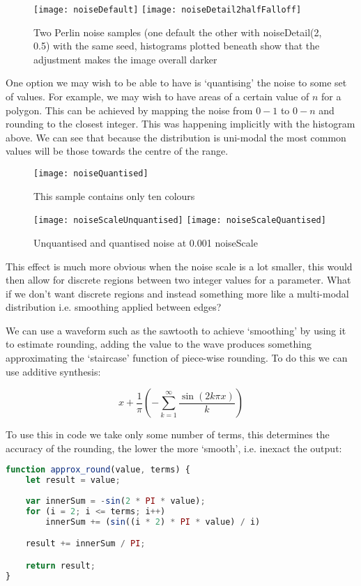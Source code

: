 \begin{figure}[H]
\centering
\texttt{[image: noiseDefault]}
\hspace{0.2cm}
\texttt{[image: noiseDetail2halfFalloff]}
\caption{Two Perlin noise samples (one default the other with
noiseDetail(2, 0.5) with the same seed, histograms plotted beneath show
that the adjustment makes the image overall darker}
\end{figure}

One option we may wish to be able to have is `quantising' the noise to some set
of values. For example, we may wish to have areas of a certain value of $n$ for a
polygon. This can be achieved by mapping the noise from $0-1$ to $0-n$ and
rounding to the closest integer. This was happening implicitly with the
histogram above. We can see that because the distribution is uni-modal the most
common values will be those towards the centre of the range.

\begin{figure}[H]
\centering
\texttt{[image: noiseQuantised]}
\caption{This sample contains only ten colours}
\end{figure}

\begin{figure}[H]
\centering
\texttt{[image: noiseScaleUnquantised]}
\hspace{0.2cm}
\texttt{[image: noiseScaleQuantised]}
\caption{Unquantised and quantised noise at 0.001 noiseScale}
\label{0.001scale}
\end{figure}

This effect is much more obvious when the noise scale is a lot smaller, this
would then allow for discrete regions between two integer values for a
parameter. What if we don't want discrete regions and instead something more
like a multi-modal distribution i.e. smoothing applied between edges?

We can use a waveform such as the sawtooth to achieve `smoothing' by using it to
estimate rounding, adding the value to the wave produces something approximating
the `staircase' function of piece-wise rounding. To do this we can use additive
synthesis:

$$x + \frac{1}{\pi} (-\sum^\infty_{k=1} \frac{\sin(2k \pi x)}{k})$$

To use this in code we take only some number of terms, this determines the
accuracy of the rounding, the lower the more `smooth', i.e. inexact the output:
\begin{lstlisting}[language=JavaScript]
function approx_round(value, terms) {
    let result = value;
    
    var innerSum = -sin(2 * PI * value);
    for (i = 2; i <= terms; i++)
        innerSum += (sin((i * 2) * PI * value) / i)

    result += innerSum / PI;

    return result;
}
\end{lstlisting}

